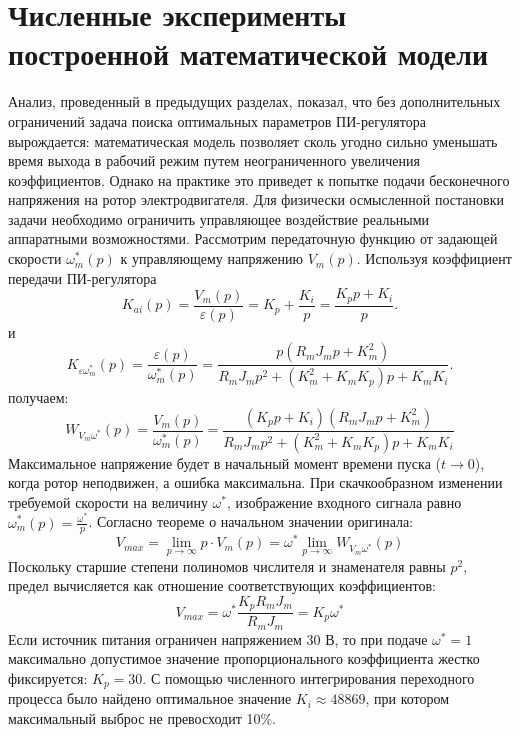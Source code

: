 \documentclass[12pt,a4paper]{extarticle}
\begin{document}
	\section{Численные эксперименты построенной математической модели}
	Анализ, проведенный в предыдущих разделах, показал, что без дополнительных ограничений задача поиска оптимальных параметров ПИ-регулятора вырождается: математическая модель позволяет сколь угодно сильно уменьшать время выхода в рабочий режим путем неограниченного увеличения коэффициентов. Однако на практике это приведет к попытке подачи бесконечного напряжения на ротор электродвигателя. Для физически осмысленной постановки задачи необходимо ограничить управляющее воздействие реальными аппаратными возможностями.
    Рассмотрим передаточную функцию от задающей скорости $\omega^*_m(p)$ к управляющему напряжению $V_m(p)$. Используя коэффициент передачи ПИ-регулятора
    \begin{equation}
		K_{ai}(p)=\dfrac{V_m(p)}{\varepsilon(p)} =K_p+\dfrac{K_i}{p}=\dfrac{K_pp+K_i}{p}.
    \end{equation} и
    \begin{equation}
		K_{\varepsilon\omega^*_m}(p)=\dfrac{\varepsilon(p)}{\omega^*_m(p)}=\dfrac{p(R_mJ_mp+K_m^2)}{R_mJ_mp^2+(K_m^2+K_mK_p)p+K_mK_i}.
    \end{equation}получаем:
    \begin{equation}
    W_{V_m\omega^*}(p) = \frac{V_m(p)}{\omega^*_m(p)} = \frac{(K_p p + K_i)(R_m J_m p + K_m^2)}{R_m J_m p^2 + (K_m^2 + K_m K_p)p + K_m K_i}
    \end{equation}
    Максимальное напряжение будет в начальный момент времени пуска ($t \to 0$), когда ротор неподвижен, а ошибка максимальна. При скачкообразном изменении требуемой скорости на величину $\omega^*$, изображение входного сигнала равно $\omega^*_m(p) = \frac{\omega^*}{p}$. Согласно теореме о начальном значении оригинала:
    \begin{equation}
    V_{max} = \lim_{p \to \infty} p \cdot V_m(p) = \omega^* \lim_{p \to \infty} W_{V_m\omega^*}(p)
    \end{equation}
    Поскольку старшие степени полиномов числителя и знаменателя равны $p^2$, предел вычисляется как отношение соответствующих коэффициентов:
    \begin{equation}
    V_{max} = \omega^* \frac{K_p R_m J_m}{R_m J_m} = K_p \omega^*
    \end{equation}
    Если источник питания ограничен напряжением 30 В, то при подаче $\omega^* = 1$ максимально допустимое значение пропорционального коэффициента жестко фиксируется: $K_p = 30$.
    С помощью численного интегрирования переходного процесса было найдено оптимальное значение $K_i \approx 48869$, при котором максимальный выброс не превосходит 10\%.
\end{document}

